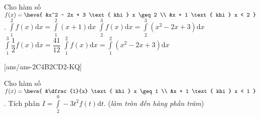 \begin{ex}%
	Cho hàm số $f(x) = \heva{
		&x^2 - 2x + 3 \text{ khi } x \geq 2 \\
		&x + 1 \text{ khi } x < 2 
	}$.
	\choiceTF
	{\True $\displaystyle\int\limits_{1}^{2} f(x) \mathrm{d}x = \displaystyle\int\limits_{1}^{2} (x + 1) \mathrm{d}x$}
	{\True $\displaystyle\int\limits_{2}^{3} f(x) \mathrm{d}x = \displaystyle\int\limits_{2}^{3} (x^2 - 2x + 3) \mathrm{d}x$}
	{\True $\displaystyle\int\limits_{1}^{3} \dfrac{1}{2} f(x) \mathrm{d}x = \dfrac{41}{12}$}
	{$\displaystyle\int\limits_{1}^{2} f(x) \mathrm{d}x = \displaystyle\int\limits_{1}^{2} (x^2 - 2x + 3) \mathrm{d}x$}
\end{ex}
\TNSA
{}[ans/ans-2C4B2CD2-KQ]
\begin{ex}%
	Cho hàm số $f(x) = \heva{
		&\dfrac{1}{x} \text{ khi } x \geq 1 \\
		&x + 1 \text{ khi } x < 1 
	}$. Tích phân $I = \displaystyle\int\limits_{2}^{0} -3t^2 f(t) \mathrm{d}t$. (\textit{\textit{làm tròn đến hàng phần trăm}})
\end{ex}
